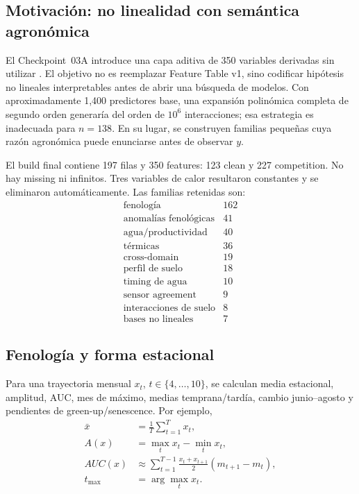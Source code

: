 \subsection{Motivación: no linealidad con semántica agronómica}

El Checkpoint~03A introduce una capa aditiva de 350 variables derivadas sin utilizar
. El objetivo no es reemplazar Feature Table v1, sino codificar
hipótesis no lineales interpretables antes de abrir una búsqueda de modelos. Con aproximadamente
1,400 predictores base, una expansión polinómica completa de segundo orden generaría del orden
de $10^6$ interacciones; esa estrategia es inadecuada para $n=138$. En su lugar, se construyen
familias pequeñas cuya razón agronómica puede enunciarse antes de observar $y$.

El build final contiene 197 filas y 350 features: 123 clean y 227 competition. No hay missing
ni infinitos. Tres variables de calor resultaron constantes y se eliminaron automáticamente.
Las familias retenidas son:
\[
\begin{array}{lr}
\text{fenología} & 162\\
\text{anomalías fenológicas} & 41\\
\text{agua/productividad} & 40\\
\text{térmicas} & 36\\
\text{cross-domain} & 19\\
\text{perfil de suelo} & 18\\
\text{timing de agua} & 10\\
\text{sensor agreement} & 9\\
\text{interacciones de suelo} & 8\\
\text{bases no lineales} & 7
\end{array}
\]

\subsection{Fenología y forma estacional}

Para una trayectoria mensual $x_t$, $t\in\{4,\ldots,10\}$, se calculan media estacional,
amplitud, AUC, mes de máximo, medias temprana/tardía, cambio junio--agosto y pendientes de
green-up/senescence. Por ejemplo,
\begin{align}
\bar x &= \frac{1}{T}\sum_{t=1}^{T}x_t,\\
A(x) &= \max_t x_t-\min_t x_t,\\
AUC(x) &\approx
\sum_{t=1}^{T-1}\frac{x_t+x_{t+1}}{2}
(m_{t+1}-m_t),\\
t_{\max} &= \arg\max_t x_t.
\end{align}

